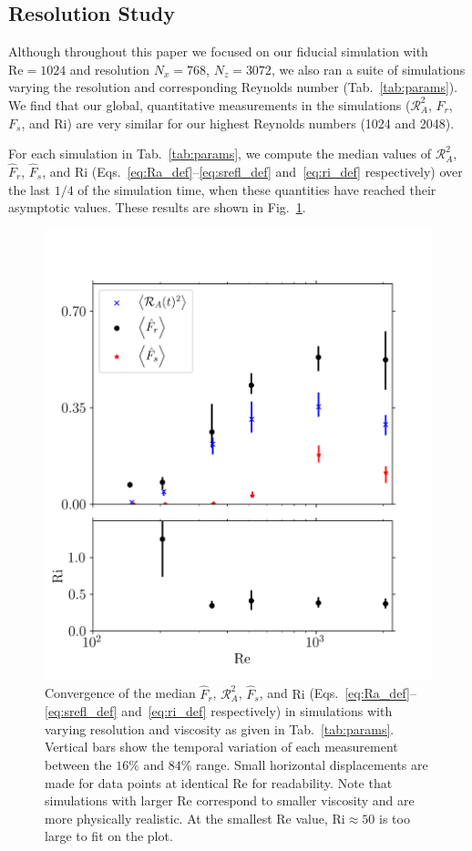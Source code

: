 \documentclass[
        fleqn,
        usenatbib,
    ]{mnras}
\begin{document}
\subsection{Resolution Study}\label{ss:convergence}

Although throughout this paper we focused on our fiducial simulation with
$\mathrm{Re} = 1024$ and resolution $N_x=768$, $N_z=3072$, we also ran a suite
of simulations varying the resolution and corresponding Reynolds number
(Tab.~\ref{tab:params}). We find that our global, quantitative measurements in
the simulations ($\mathcal{R}_A^2$, $F_r$, $F_s$, and $\mathrm{Ri}$) are very
similar for our highest Reynolds numbers (1024 and 2048).

For each simulation in Tab.~\ref{tab:params}, we compute the median values of
$\mathcal{R}_A^2$, $\hat{F}_r$, $\hat{F}_s$, and $\mathrm{Ri}$
(Eqs.~\eqref{eq:Ra_def}--\eqref{eq:srefl_def} and~\eqref{eq:ri_def}
respectively) over the last $1/4$ of the simulation time, when these quantities
have reached their asymptotic values. These results are shown in
Fig.~\ref{fig:agg}.

\begin{figure}
    \centering
    \includegraphics[width=0.9\columnwidth]{plots/agg.png}
    \caption{Convergence of the median $\hat{F}_r$, $\mathcal{R}_A^2$,
    $\hat{F}_s$, and $\mathrm{Ri}$ (Eqs.~\eqref{eq:Ra_def}--\eqref{eq:srefl_def}
    and~\eqref{eq:ri_def} respectively) in simulations with varying resolution
    and viscosity as given in Tab.~\ref{tab:params}. Vertical bars show the
    temporal variation of each measurement between the $16\%$ and $84\%$ range.
    Small horizontal displacements are made for data points at identical
    $\mathrm{Re}$ for readability. Note that simulations with larger
    $\mathrm{Re}$ correspond to smaller viscosity and are more physically
    realistic. At the smallest $\mathrm{Re}$ value, $\mathrm{Ri} \approx 50$ is
    too large to fit on the plot.}\label{fig:agg}
\end{figure}
\end{document}

